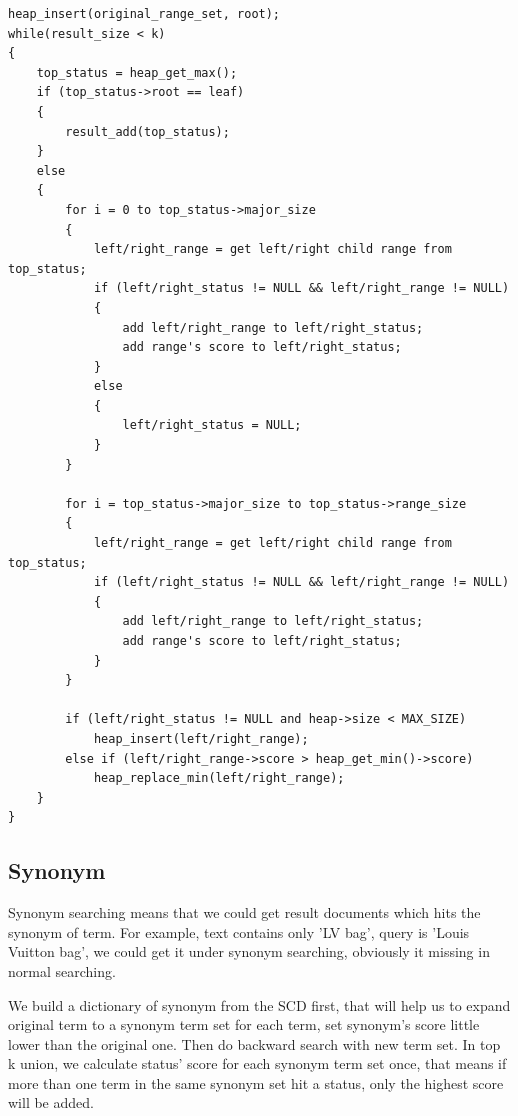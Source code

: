 \begin{scriptsize} \begin{verbatim}
heap_insert(original_range_set, root);
while(result_size < k)
{
    top_status = heap_get_max();
    if (top_status->root == leaf)
    {
        result_add(top_status);
    }
    else
    {
        for i = 0 to top_status->major_size
        {
            left/right_range = get left/right child range from top_status;
            if (left/right_status != NULL && left/right_range != NULL)
            {
                add left/right_range to left/right_status;
                add range's score to left/right_status;
            }
            else
            {
                left/right_status = NULL;
            }
        }

        for i = top_status->major_size to top_status->range_size
        {
            left/right_range = get left/right child range from top_status;
            if (left/right_status != NULL && left/right_range != NULL)
            {
                add left/right_range to left/right_status;
                add range's score to left/right_status;
            }
        }

        if (left/right_status != NULL and heap->size < MAX_SIZE)
            heap_insert(left/right_range);
        else if (left/right_range->score > heap_get_min()->score)
            heap_replace_min(left/right_range);
    }
}
\end{verbatim} \end{scriptsize}

\subsection{Synonym}

Synonym searching means that we could get result documents which hits the synonym of term. For example, text contains only 'LV bag', query is 'Louis Vuitton bag', we could get it under synonym searching, obviously it missing in normal searching.

We build a dictionary of synonym from the SCD first, that will help us to expand original term to a synonym term set for each term, set synonym's score little lower than the original one. Then do backward search with new term set.
In top k union, we calculate status' score for each synonym term set once, that means if more than one term in the same synonym set hit a status, only the highest score will be added.
